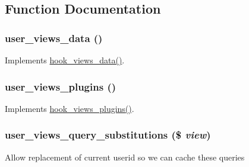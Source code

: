 \subsection{Function Documentation}
\hypertarget{user_8views_8inc_a8de9e9f62db27dac6f5778d4362a7dc2}{
\subsubsection[{user\_\-views\_\-data}]{\setlength{\rightskip}{0pt plus 5cm}user\_\-views\_\-data ()}}
\label{user_8views_8inc_a8de9e9f62db27dac6f5778d4362a7dc2}
Implements \hyperlink{group__views__hooks_ga227057901681e4a33e33c199c7a8c989}{hook\_\-views\_\-data()}. \hypertarget{user_8views_8inc_aa36ee99043e81c01d59f8f7c47d310d1}{
\subsubsection[{user\_\-views\_\-plugins}]{\setlength{\rightskip}{0pt plus 5cm}user\_\-views\_\-plugins ()}}
\label{user_8views_8inc_aa36ee99043e81c01d59f8f7c47d310d1}
Implements \hyperlink{group__views__hooks_ga23f6e9972b2ed84fc54b7ff63f44477d}{hook\_\-views\_\-plugins()}. \hypertarget{user_8views_8inc_ae3007fb2a7423125b3458d4018293eba}{
\subsubsection[{user\_\-views\_\-query\_\-substitutions}]{\setlength{\rightskip}{0pt plus 5cm}user\_\-views\_\-query\_\-substitutions (\$ {\em view})}}
\label{user_8views_8inc_ae3007fb2a7423125b3458d4018293eba}
Allow replacement of current userid so we can cache these queries 